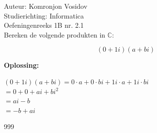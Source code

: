 \documentclass[a4paper]{article}
\begin{document}
	
	\noindent \large Auteur: Komronjon Vosidov \\
	\noindent \large Studierichting: Informatica\\
	\noindent \large Oefeningenreeks 1B nr. 2.1\\
	
	
	
	\normalsize
	  Bereken de volgende produkten in $\mathbb{C}$:
	
	\begin{equation*}
		(0 + 1i)(a + bi)
	\end{equation*}
	
	
	\noindent \textbf{Oplossing:}
	
	$(0 + 1i)(a + bi) = 0 \cdot a + 0 \cdot bi + 1i \cdot a + 1i \cdot bi$ \\	
	
	$= 0 + 0 + ai + b i^2 $ \\
	
	$= ai - b$ \\
	
	$= -b + ai$ \\
	
\begin{thebibliography}{999}
	
\end{thebibliography}

	
\end{document}
